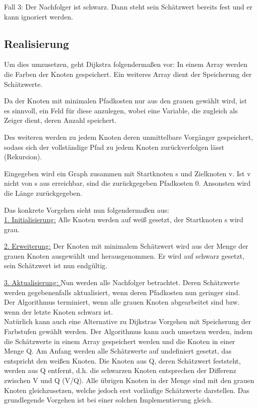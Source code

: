 \parindent0pt Fall 3: Der Nachfolger ist schwarz. Dann steht sein Schätzwert bereits fest und er kann ignoriert werden.

\subsection{Realisierung}
Um dies umzusetzen, geht Dijkstra folgendermaßen vor: In einem Array werden die Farben der Knoten gespeichert. Ein weiteres Array dient der Speicherung der Schätzwerte. 

\parindent0pt Da der Knoten mit minimalen Pfadkosten nur aus den grauen gewählt wird, ist es sinnvoll, ein Feld für diese anzulegen, wobei eine Variable, die zugleich als Zeiger dient, deren Anzahl speichert.

\parindent0pt Des weiteren werden zu jedem Knoten deren unmittelbare Vorgänger gespeichert, sodass sich der vollständige Pfad zu jedem Knoten zurückverfolgen lässt (Rekursion).

\parindent0pt Eingegeben wird ein Graph zusammen mit Startknoten s und Zielknoten v. Ist v nicht von s aus erreichbar, sind die zurückgegeben Pfadkosten 0. Ansonsten wird die Länge zurückgegeben.

\parindent0pt Das konkrete Vorgehen sieht nun folgendermaßen aus: \\

\parindent0pt \underline{1. Initialisierung:} Alle Knoten werden auf weiß gesetzt, der Startknoten s wird grau.

\parindent0pt \underline{2. Erweiterung:} Der Knoten mit minimalem Schätzwert wird aus der Menge der grauen Knoten ausgewählt und herausgenommen. Er wird auf schwarz gesetzt, sein Schätzwert ist nun endgültig.

\parindent0pt \underline{3. Aktualisierung: }Nun werden alle Nachfolger betrachtet. Deren Schätzwerte werden gegebenenfalls aktualisiert, wenn deren Pfadkosten nun geringer sind. \\ 

\parindent0pt Der Algorithmus terminiert, wenn alle grauen Knoten abgearbeitet sind bzw. wenn der letzte Knoten schwarz ist. \\

Natürlich kann auch eine Alternative zu Dijkstras Vorgehen mit Speicherung der Farbstufen gewählt werden. Der Algorithmus kann auch umsetzen werden, indem die Schätzwerte in einem Array gespeichert werden und die Knoten in einer Menge Q. Am Anfang werden alle Schätzwerte auf undefiniert gesetzt, das entspricht den weißen Knoten. Die Knoten aus Q, deren Schätzwert feststeht, werden aus Q entfernt, d.h. die schwarzen Knoten entsprechen der Differenz zwischen V und Q (V/Q). Alle übrigen Knoten in der Menge sind mit den grauen Knoten gleichzusetzen, welche jedoch erst vorläufige Schätzwerte darstellen. Das grundlegende Vorgehen ist bei einer solchen Implementierung gleich. 



